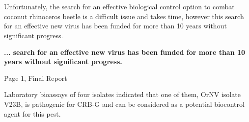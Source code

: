 \documentclass[]{scrartcl}
\title{}
\author{}
\begin{document}
\maketitle

\begin{abstract}

\end{abstract}

\section{}

Unfortunately, the search for an effective biological control option to combat coconut rhinoceros beetle is a difficult issue and takes time, however this search for an effective new virus has been funded for more than 10 years without significant progress.

\textbf{... search for an effective new virus has been funded for more than 10 years without significant progress.}






Page 1, Final Report \cite{moore_final_2019}

Laboratory bioassays of four isolates indicated that one of them, OrNV isolate V23B, is pathogenic for CRB-G and can be considered as a potential biocontrol agent for this pest.

\printbibliography
\end{document}
